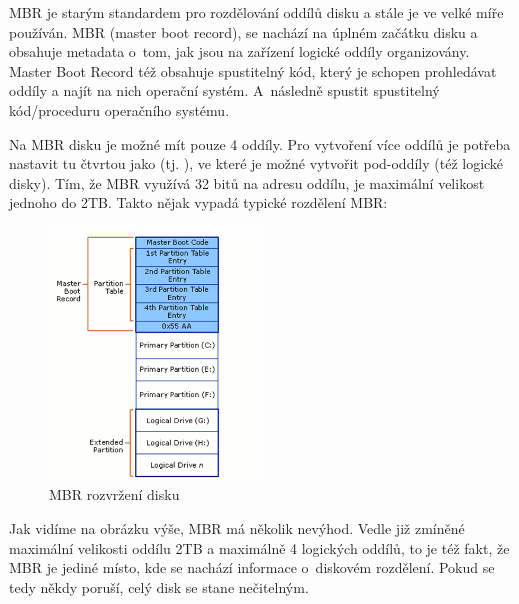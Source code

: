 MBR je starým standardem pro rozdělování oddílů disku a stále je ve velké míře používán. MBR (master boot record), se nachází na úplném začátku disku a obsahuje metadata o~tom, jak jsou na zařízení logické oddíly organizovány. Master Boot Record též obsahuje spustitelný kód, který je schopen prohledávat oddíly a najít na nich operační systém. A~následně spustit spustitelný kód/proceduru operačního systému.


Na MBR disku je možné mít pouze 4 oddíly. Pro vytvoření více oddílů je potřeba nastavit tu čtvrtou jako   (tj. ), ve které je možné vytvořit pod-oddíly (též logické disky). Tím, že MBR využívá 32 bitů na adresu oddílu, je maximální velikost jednoho do 2TB. Takto nějak vypadá typické rozdělení MBR:
\newpage



\begin{figure}[H]\centering
\includegraphics[width=0.5\textwidth]{files/mbr-disk-layout.png}
	\caption{MBR rozvržení disku \cite{gpt-mbr-pic}}\label{fig:float}
\end{figure}



Jak vidíme na obrázku výše, MBR má několik nevýhod. Vedle již zmíněné maximální velikosti oddílu 2TB a maximálně 4 logických oddílů, to je též fakt, že MBR je jediné místo, kde se nachází informace o~diskovém rozdělení. Pokud se tedy někdy poruší, celý disk se stane nečitelným.



